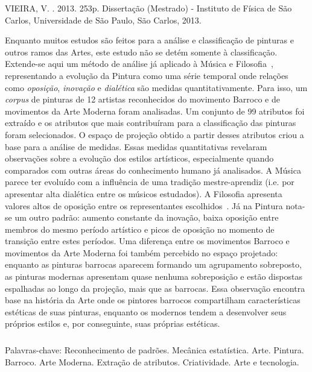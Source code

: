\begin{resumo2}
\vspace{-10mm}
VIEIRA, V. \textbf{\ABNTtitulodata}. 2013. 253p. Dissertação (Mestrado) - Instituto de Física de São Carlos, Universidade de São Paulo, São Carlos, 2013.
\vspace{15mm}

Enquanto muitos estudos são feitos para a análise e classificação de
pinturas e outros ramos das Artes, este estudo não se detém somente à
classificação. Extende-se aqui um método de análise já aplicado à
Música e Filosofia~\cite{vieira}, representando a evolução da Pintura
como uma série temporal onde relações como \textit{oposição},
\textit{inovação} e \textit{dialética} são medidas
quantitativamente. Para isso, um \textit{corpus} de pinturas de 12
artistas reconhecidos do movimento Barroco e de movimentos da Arte
Moderna foram analisadas. Um conjunto de 99 atributos foi extraído e
os atributos que mais contribuíram para a classificação das pinturas
foram selecionados. O espaço de projeção obtido a partir desses
atributos criou a base para a análise de medidas. Essas medidas
quantitativas revelaram observações sobre a evolução dos estilos
artísticos, especialmente quando comparados com outras áreas do
conhecimento humano já analisados. A Música parece ter evoluído com a
influência de uma tradição mestre-aprendiz (i.e. por apresentar alta
dialética entre os músicos estudados). A Filosofia apresenta valores
altos de oposição entre os representantes escolhidos~\cite{vieira}. Já
na Pintura nota-se um outro padrão: aumento constante da inovação,
baixa oposição entre membros do mesmo período artístico e picos de
oposição no momento de transição entre estes períodos. Uma diferença
entre os movimentos Barroco e movimentos da Arte Moderna foi também
percebido no espaço projetado: enquanto as pinturas barrocas aparecem
formando um agrupamento sobreposto, as pinturas modernas apresentam
quase nenhuma sobreposição e estão dispostas espalhadas ao longo da
projeção, mais que as barrocas. Essa observação encontra base na
história da Arte onde os pintores barrocos compartilham
características estéticas de suas pinturas, enquanto os modernos
tendem a desenvolver seus próprios estilos e, por conseguinte, suas
próprias estéticas.

$\phantom{linha em branco}$\\ Palavras-chave: Reconhecimento de
padrões. Mecânica estatística. Arte. Pintura. Barroco. Arte
Moderna. Extração de atributos. Criatividade. Arte e tecnologia.

\end{resumo2}


